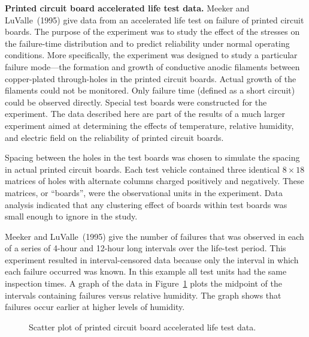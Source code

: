 \begin{example}
\label{example:caf.alt.data}
{\bf Printed circuit board accelerated life test data.} Meeker and
LuValle~(1995) give data from an accelerated life test on failure of
printed circuit boards. The purpose of the experiment was to study the
effect of the stresses on the failure-time distribution and to
predict reliability under normal operating conditions. More
specifically, the experiment was designed to study a particular
failure mode---the formation and growth of conductive anodic
filaments between copper-plated through-holes in the printed circuit
boards.  Actual growth of the filaments could not be monitored. Only
failure time (defined as a short circuit) could be observed
directly.  Special test boards were constructed for the experiment.
The data described here are part of the results of a much larger
experiment aimed at determining the effects of temperature, relative
humidity, and electric field on the reliability of printed circuit
boards.

Spacing between the holes in the test boards was chosen to simulate
the spacing in actual printed circuit boards.  Each test vehicle
contained three identical $8\times 18$ matrices of holes with
alternate columns charged positively and negatively.  These matrices,
or ``boards'', were the observational units in the experiment.  Data
analysis indicated that any clustering effect of boards within test
boards was small enough to ignore in the study.

Meeker and LuValle~(1995) give the number of failures that was
observed in each of a series of 4-hour and 12-hour long intervals over
the life-test period.  This experiment resulted in interval-censored
data because only the interval in which each failure occurred was
known.  In this example all test units had the same inspection times.
A graph of the data in Figure~\ref{figure:luvalle.scatter.ps} plots
the midpoint of the intervals containing failures versus relative
humidity.  The graph shows that failures occur earlier at higher
levels of humidity.
\begin{figure}
\caption{Scatter plot of printed circuit board accelerated life test data.}
\label{figure:luvalle.scatter.ps}
\end{figure}
\end{example}

